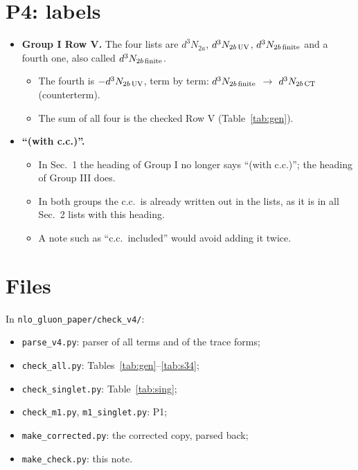 \documentclass[10pt]{article}
\numberwithin{equation}{section}
\newcommand{\new}[1]{{\color{blue}#1}}
\newcommand{\old}[1]{{\color{red}#1}}
\begin{document}
\section{P4: labels}\label{sec:p4}
\begin{itemize}
\item \textbf{Group I Row V.} The four lists are $d^3N_{2a}$, $d^3N_{2b\,\rm UV}$, $d^3N_{2b\,\rm finite}$ and a fourth one, also called $d^3N_{2b\,\rm finite}$.
\begin{itemize}
\item The fourth is $-d^3N_{2b\,\rm UV}$, term by term: \old{$d^3N_{2b\,\rm finite}$} $\to$ \new{$d^3N_{2b\,\rm CT}$} (counterterm).
\item The sum of all four is the checked Row V (Table~\ref{tab:gen}).
\end{itemize}
\item \textbf{``(with c.c.)''.}
\begin{itemize}
\item In Sec.~1 the heading of Group I no longer says ``(with c.c.)''; the heading of Group III does.
\item In both groups the c.c.\ is already written out in the lists, as it is in all Sec.~2 lists with this heading.
\item A note such as ``c.c.\ included'' would avoid adding it twice.
\end{itemize}
\end{itemize}

\section*{Files}
In \texttt{nlo\_gluon\_paper/check\_v4/}:
\begin{itemize}
\item \texttt{parse\_v4.py}: parser of all terms and of the trace forms;
\item \texttt{check\_all.py}: Tables~\ref{tab:gen}--\ref{tab:s34};
\item \texttt{check\_singlet.py}: Table~\ref{tab:sing};
\item \texttt{check\_m1.py}, \texttt{m1\_singlet.py}: P1;
\item \texttt{make\_corrected.py}: the corrected copy, parsed back;
\item \texttt{make\_check.py}: this note.
\end{itemize}
\end{document}
